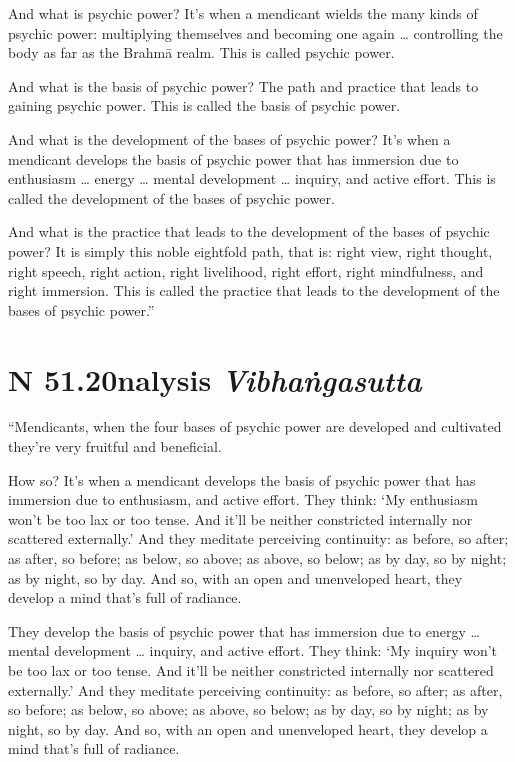 \documentclass[12pt,openany]{book}%
\newcommand*{\suttatitleacronym}[1]{\smaller[2]{#1}\vspace*{.3em}}
\newcommand*{\suttatitletranslation}[1]{\linebreak{#1}}
\newcommand*{\suttatitleroot}[1]{\linebreak\smaller[2]\itshape{#1}}
\newcommand*{\tocacronym}[1]{\hspace*{-3.3em}{#1}\quad}
\newcommand*{\toctranslation}[1]{#1}
\newcommand*{\tocroot}[1]{(\textit{#1})}
\begin{document}
And what is psychic power? It’s when a mendicant wields the many kinds of psychic power: multiplying themselves and becoming one again … controlling the body as far as the \textsanskrit{Brahmā} realm. This is called psychic power. 

And what is the basis of psychic power? The path and practice that leads to gaining psychic power. This is called the basis of psychic power. 

And what is the development of the bases of psychic power? It’s when a mendicant develops the basis of psychic power that has immersion due to enthusiasm … energy … mental development … inquiry, and active effort. This is called the development of the bases of psychic power. 

And what is the practice that leads to the development of the bases of psychic power? It is simply this noble eightfold path, that is: right view, right thought, right speech, right action, right livelihood, right effort, right mindfulness, and right immersion. This is called the practice that leads to the development of the bases of psychic power.” 

%
\section*{{\suttatitleacronym SN 51.20}{\suttatitletranslation Analysis }{\suttatitleroot Vibhaṅgasutta}}
\addcontentsline{toc}{section}{\tocacronym{SN 51.20} \toctranslation{Analysis } \tocroot{Vibhaṅgasutta}}

“Mendicants, when the four bases of psychic power are developed and cultivated they’re very fruitful and beneficial. 

How so? It’s when a mendicant develops the basis of psychic power that has immersion due to enthusiasm, and active effort. They think: ‘My enthusiasm won’t be too lax or too tense. And it’ll be neither constricted internally nor scattered externally.’ And they meditate perceiving continuity: as before, so after; as after, so before; as below, so above; as above, so below; as by day, so by night; as by night, so by day. And so, with an open and unenveloped heart, they develop a mind that’s full of radiance. 

They develop the basis of psychic power that has immersion due to energy … mental development … inquiry, and active effort. They think: ‘My inquiry won’t be too lax or too tense. And it’ll be neither constricted internally nor scattered externally.’ And they meditate perceiving continuity: as before, so after; as after, so before; as below, so above; as above, so below; as by day, so by night; as by night, so by day. And so, with an open and unenveloped heart, they develop a mind that’s full of radiance. 
\end{document}
